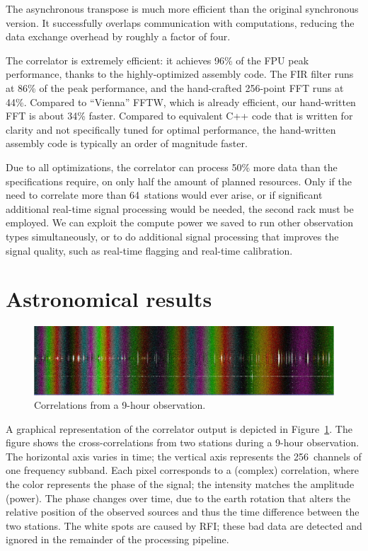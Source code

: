 \documentclass{sig-alternate}
\begin{document}
The asynchronous transpose is much more efficient than the original synchronous
version. It successfully overlaps communication with computations, reducing
the data exchange overhead by roughly a factor of four.

The correlator is extremely efficient: it achieves 96\% of the FPU
peak performance, thanks to the highly-optimized assembly code.  The
FIR filter runs at 86\% of the peak performance, and the hand-crafted
256-point FFT runs at 44\%.  Compared to ``Vienna'' FFTW, which is already
efficient, our hand-written FFT is about 34\% faster.
Compared to equivalent C++ code that is written for clarity and
not specifically tuned for optimal performance, the hand-written
assembly code is typically an order of magnitude faster.


Due to all optimizations, the correlator can process 50\% more data than
the specifications require, on only half the amount of planned resources.
Only if the need to correlate more than 64~stations would ever arise, or if
significant additional real-time signal processing would be needed, the
second rack must be employed.
We can exploit the compute power we saved to run other observation types
simultaneously, or to do additional signal processing that improves the
signal quality, such as real-time flagging and real-time calibration.


\section{Astronomical results}
\label{sec:results}

\begin{figure}[ht]
\includegraphics[width=\columnwidth]{fringe.jpg}
\caption{Correlations from a 9-hour observation.}
\label{fig:fringe}
\end{figure}

A graphical representation of the correlator output is depicted in
Figure~\ref{fig:fringe}.
The figure shows the cross-correlations from two stations during a 9-hour
observation.
The horizontal axis varies in time;
the vertical axis represents the 256~channels of one frequency subband.
Each pixel corresponds to a (complex) correlation, where the color represents
the phase of the signal; the intensity matches the amplitude (power).
The phase changes over time, due to the earth rotation that alters the
relative position of the observed sources and thus the time difference
between the two stations.
The white spots are caused by RFI; these bad data are detected and
ignored in the remainder of the processing pipeline.
\end{document}

